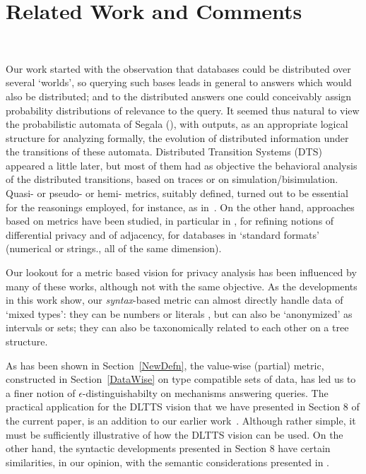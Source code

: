 \documentclass[pdflatex]{article}
\begin{document}
     
 \vspace*{-1.2em}
  \section{ {\large Related Work and Comments} }~\label{Conclude}
  \vspace*{-1.2em}

  Our work started with the observation that  databases   could be distributed over
  several `worlds', so querying  such bases   leads  in general to  answers which
  would also be distributed; and to the  distributed  answers  one could conceivably
  assign probability distributions  of relevance  to   the query.  It seemed  thus natural
  to view  the  probabilistic automata of Segala (\cite{Segala95a,Segala95b}),
  with  outputs, as an appropriate logical  structure for analyzing formally, 
  the evolution of distributed information  under  the transitions of these automata.
  Distributed  Transition   Systems (DTS) appeared a little   later, but most of  them
  had as objective  the behavioral  analysis of the  distributed   transitions, based on
  traces or  on   simulation/bisimulation.   Quasi- or pseudo-  or hemi- metrics,
  suitably defined,  turned out to be  essential for  the reasonings  employed,
  for instance,   as in~\cite{Fast2018,PTS2019,LBr-SystMetrics09}.   On the other hand,
  approaches  based on metrics  have been studied,  in particular in  \cite{dpMetrics2013},
  for  refining notions of differential privacy and of adjacency, for databases  in
  `standard formats' (numerical  or strings., all of the same dimension).  
  
  Our lookout for a metric based  vision   for privacy analysis has   been
  influenced  by many of these works,  although not  with the same objective.
  As the developments in this work show, our {\em syntax}-based   metric can
  almost directly handle data of  `mixed types':  they can be numbers or
  literals , but can  also be `anonymized'   as intervals or sets; they can also be
  taxonomically  related to each other on a  tree structure. 
  

  As has been shown in Section~\ref{NewDefn}, the value-wise (partial) metric, 
  constructed in  Section~\ref{DataWise} on type compatible sets of data, has
  led us to a finer notion of $\epsilon$-distinguishabilty on  mecha\-nisms answering
  queries.  The practical application for the DLTTS vision that we have  presented in
  Section $8$ of the current paper,  is an addition to our earlier work~\cite{siva-etal-2022}. 
  Although rather simple, it must be sufficiently illustrative of how the   DLTTS  vision
  can be used. On the other hand, the syntactic developments presented in Section
  $8$  have certain similarities, in our opinion, with the semantic considerations
  presented in  \cite{ChenChu2008}. 
\end{document}
